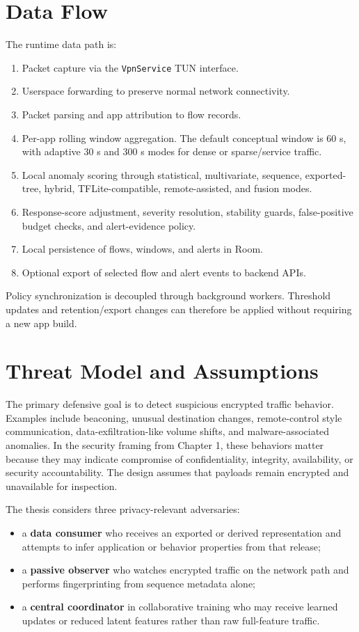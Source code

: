 \section{Data Flow}
The runtime data path is:
\begin{enumerate}[leftmargin=*]
  \item Packet capture via the \texttt{VpnService} TUN interface.
  \item Userspace forwarding to preserve normal network connectivity.
  \item Packet parsing and app attribution to flow records.
  \item Per-app rolling window aggregation. The default conceptual window is 60 s, with adaptive
  30 s and 300 s modes for dense or sparse/service traffic.
  \item Local anomaly scoring through statistical, multivariate, sequence, exported-tree, hybrid,
  TFLite-compatible, remote-assisted, and fusion modes.
  \item Response-score adjustment, severity resolution, stability guards, false-positive budget
  checks, and alert-evidence policy.
  \item Local persistence of flows, windows, and alerts in Room.
  \item Optional export of selected flow and alert events to backend APIs.
\end{enumerate}

Policy synchronization is decoupled through background workers. Threshold updates and
retention/export changes can therefore be applied without requiring a new app build.

\section{Threat Model and Assumptions}
The primary defensive goal is to detect suspicious encrypted traffic behavior. Examples include
beaconing, unusual destination changes, remote-control style communication,
data-exfiltration-like volume shifts, and malware-associated anomalies. In the security framing from
Chapter 1, these behaviors matter because they may indicate compromise of confidentiality,
integrity, availability, or security accountability. The design assumes that payloads remain
encrypted and unavailable for inspection.

The thesis considers three privacy-relevant adversaries:
\begin{itemize}[leftmargin=*]
  \item a \textbf{data consumer} who receives an exported or derived representation and attempts to
  infer application or behavior properties from that release;
  \item a \textbf{passive observer} who watches encrypted traffic on the network path and performs
  fingerprinting from sequence metadata alone;
  \item a \textbf{central coordinator} in collaborative training who may receive learned updates or
  reduced latent features rather than raw full-feature traffic.
\end{itemize}


